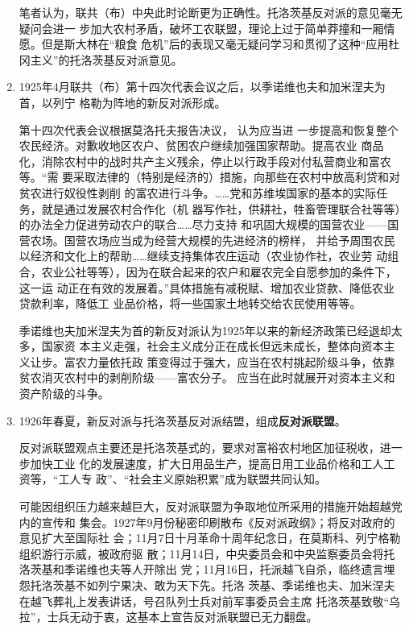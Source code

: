 \begin{enumerate}
  笔者认为，联共（布）中央此时论断更为正确性。托洛茨基反对派的意见毫无疑问会进一
  步加大农村矛盾，破坏工农联盟，理论上过于简单莽撞和一厢情愿。但是斯大林在``粮食
  危机''后的表现又毫无疑问学习和贯彻了这种``应用杜冈主义''的托洛茨基反对派意见。
  
\item 1925年4月联共（布）第十四次代表会议之后，以季诺维也夫和加米涅夫为首，以列宁
  格勒为阵地的新反对派形成。

  第十四次代表会议根据莫洛托夫报告决议， 认为应当进
  一步提高和恢复整个农民经济。对歉收地区农户、贫困农户继续加强国家帮助。提高农业
  商品化，消除农村中的战时共产主义残余，停止以行政手段对付私营商业和富农等。``需
  要采取法律的（特别是经济的）措施，向那些在农村中放高利贷和对贫农进行奴役性剥削
  的富农进行斗争。……党和苏维埃国家的基本的实际任务，就是通过发展农村合作化（机
  器写作社，供耕社，牲畜管理联合社等等）的办法全力促进劳动农户的联合……尽力支持
  和巩固大规模的国营农业——国营农场。国营农场应当成为经营大规模的先进经济的榜样，
  并给予周围农民以经济和文化上的帮助……继续支持集体农庄运动（农业协作社，农业劳
  动组合，农业公社等等），因为在联合起来的农户和雇农完全自愿参加的条件下，这一运
  动正在有效的发展着。''具体措施有减税赋、增加农业贷款、降低农业贷款利率，降低工
  业品价格，将一些国家土地转交给农民使用等等。

  季诺维也夫加米涅夫为首的新反对派认为1925年以来的新经济政策已经退却太多，国家资
  本主义走强，社会主义成分正在成长但远未成长，整体向资本主义让步。富农力量依托政
  策变得过于强大，应当在农村挑起阶级斗争，依靠贫农消灭农村中的剥削阶级——富农分子。
  应当在此时就展开对资本主义和资产阶级的斗争。

\item 1926年春夏，新反对派与托洛茨基反对派结盟，组成\textbf{反对派联盟}。

  反对派联盟观点主要还是托洛茨基式的，要求对富裕农村地区加征税收，进一步加快工业
  化的发展速度，扩大日用品生产，提高日用工业品价格和工人工资等，``工人专
  政''、``社会主义原始积累''成为联盟共同认知。

  可能因组织压力越来越巨大，反对派联盟为争取地位所采用的措施开始超越党内的宣传和
  集会。1927年9月份秘密印刷散布《反对派政纲》；将反对政府的意见扩大至国际社
  会；11月7日十月革命十周年纪念日，在莫斯科、列宁格勒组织游行示威，被政府驱
  散；11月14日，中央委员会和中央监察委员会将托洛茨基和季诺维也夫等人开除出
  党；11月16日，托派越飞自杀，临终遗言埋怨托洛茨基不如列宁果决、敢为天下先。托洛
  茨基、季诺维也夫、加米涅夫在越飞葬礼上发表讲话，号召队列士兵对前军事委员会主席
  托洛茨基致敬“乌拉”，士兵无动于衷，这基本上宣告反对派联盟已无力翻盘。
  

\end{enumerate}
